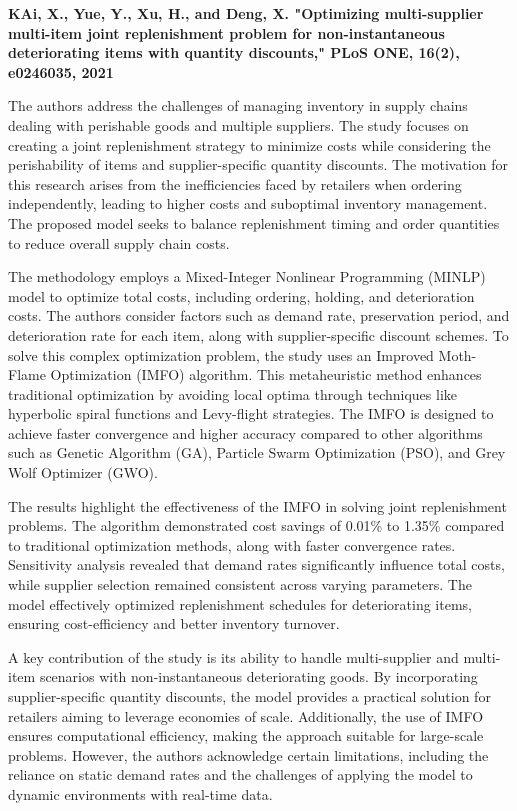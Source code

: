 \textbf{\cite{ai2021multisupplier}KAi, X., Yue, Y., Xu, H., and Deng, X. "Optimizing multi-supplier multi-item joint replenishment problem for non-instantaneous deteriorating items with quantity discounts," PLoS ONE, 16(2), e0246035, 2021}

The authors address the challenges of managing inventory in supply chains dealing with perishable goods and multiple suppliers. The study focuses on creating a joint replenishment strategy to minimize costs while considering the perishability of items and supplier-specific quantity discounts. The motivation for this research arises from the inefficiencies faced by retailers when ordering independently, leading to higher costs and suboptimal inventory management. The proposed model seeks to balance replenishment timing and order quantities to reduce overall supply chain costs.

The methodology employs a Mixed-Integer Nonlinear Programming (MINLP) model to optimize total costs, including ordering, holding, and deterioration costs. The authors consider factors such as demand rate, preservation period, and deterioration rate for each item, along with supplier-specific discount schemes. To solve this complex optimization problem, the study uses an Improved Moth-Flame Optimization (IMFO) algorithm. This metaheuristic method enhances traditional optimization by avoiding local optima through techniques like hyperbolic spiral functions and Levy-flight strategies. The IMFO is designed to achieve faster convergence and higher accuracy compared to other algorithms such as Genetic Algorithm (GA), Particle Swarm Optimization (PSO), and Grey Wolf Optimizer (GWO).

The results highlight the effectiveness of the IMFO in solving joint replenishment problems. The algorithm demonstrated cost savings of 0.01\% to 1.35\% compared to traditional optimization methods, along with faster convergence rates. Sensitivity analysis revealed that demand rates significantly influence total costs, while supplier selection remained consistent across varying parameters. The model effectively optimized replenishment schedules for deteriorating items, ensuring cost-efficiency and better inventory turnover.

A key contribution of the study is its ability to handle multi-supplier and multi-item scenarios with non-instantaneous deteriorating goods. By incorporating supplier-specific quantity discounts, the model provides a practical solution for retailers aiming to leverage economies of scale. Additionally, the use of IMFO ensures computational efficiency, making the approach suitable for large-scale problems. However, the authors acknowledge certain limitations, including the reliance on static demand rates and the challenges of applying the model to dynamic environments with real-time data.


